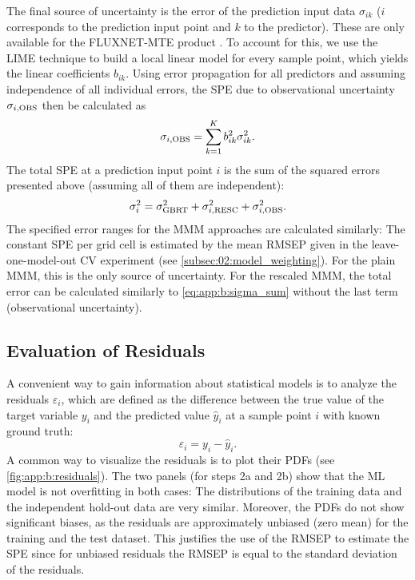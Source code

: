 The final source of uncertainty is the error of the prediction input data
$\sigma_{ik}$ ($i$ corresponds to the prediction input point and $k$ to the
predictor). These are only available for the FLUXNET-MTE product
\autocite{Jung2011}. To account for this, we use the \acf{LIME} technique
 to build a local linear
model for every sample point, which yields the linear coefficients $b_{ik}$.
Using error propagation for all predictors and assuming independence of all
individual errors, the \ac{SPE} due to observational uncertainty $\sigma_{i,
  \textnormal{OBS}}$ then be calculated as
\begin{equation}
  \sigma_{i, \textnormal{OBS}} = \sum_{k=1}^{K} b_{ik}^2 \sigma_{ik}^2.
  \label{eq:app:b:sigma_obs}
\end{equation}
The total \ac{SPE} at a prediction input point $i$ is the sum of the squared
errors presented above (assuming all of them are independent):
\begin{equation}
  \sigma_i^2 = \sigma_{\textnormal{GBRT}}^2 + \sigma_{i, \textnormal{RESC}}^2 +
  \sigma_{i, \textnormal{OBS}}^2.
  \label{eq:app:b:sigma_sum}
\end{equation}
The specified error ranges for the \ac{MMM} approaches are calculated
similarly: The constant \ac{SPE} per grid cell is estimated by the mean
\ac{RMSEP} given in the leave-one-model-out \ac{CV} experiment (see
\cref{subsec:02:model_weighting}). For the plain \ac{MMM}, this is the only
source of uncertainty. For the rescaled \ac{MMM}, the total error can be
calculated similarly to \cref{eq:app:b:sigma_sum} without the last term
(observational uncertainty).


\subsection{Evaluation of Residuals}
\label{subsec:app:b:residuals}

A convenient way to gain information about statistical models is to analyze the
residuals $\varepsilon_i$, which are defined as the difference between the true
value of the target variable $y_i$ and the predicted value $\hat{y}_i$ at a
sample point $i$ with known ground truth:
\begin{equation}
  \varepsilon_i = y_i - \hat{y}_i.
  \label{eq:app:b:residuals}
\end{equation}
A common way to visualize the residuals is to plot their \acfp{PDF} (see
\cref{fig:app:b:residuals}). The two panels (for steps 2a and 2b) show that the
\ac{ML} model is not overfitting in both cases: The distributions of the
training data and the independent hold-out data are very similar. Moreover, the
\acp{PDF} do not show significant biases, as the residuals are approximately
unbiased (zero mean) for the training and the test dataset. This justifies the
use of the \ac{RMSEP} to estimate the \ac{SPE} since for unbiased residuals
the \ac{RMSEP} is equal to the standard deviation of the residuals.

